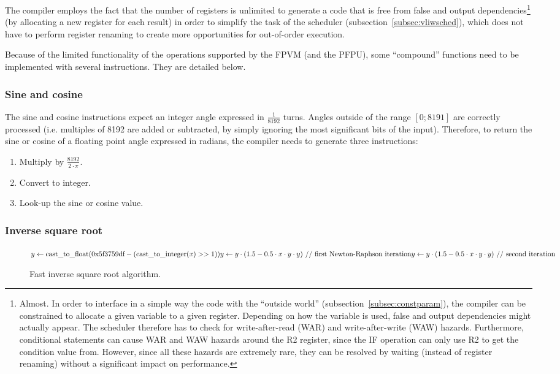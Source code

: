 \documentclass[a4paper,11pt]{kthesis}
\begin{document}
The compiler employs the fact that the number of registers is unlimited to generate a code that is free from false and output dependencies\footnote{Almost. In order to interface in a simple way the code with the ``outside world'' (subsection~\ref{subsec:constparam}), the compiler can be constrained to allocate a given variable to a given register. Depending on how the variable is used, false and output dependencies might actually appear. The scheduler therefore has to check for write-after-read (WAR) and write-after-write (WAW) hazards. Furthermore, conditional statements can cause WAR and WAW hazards around the R2 register, since the IF operation can only use R2 to get the condition value from. However, since all these hazards are extremely rare, they can be resolved by waiting (instead of register renaming) without a significant impact on performance.} (by allocating a new register for each result) in order to simplify the task of the scheduler (subsection~\ref{subsec:vliwsched}), which does not have to perform register renaming to create more opportunities for out-of-order execution.

Because of the limited functionality of the operations supported by the FPVM (and the PFPU), some ``compound'' functions need to be implemented with several instructions. They are detailed below.

\subsubsection{Sine and cosine}
The sine and cosine instructions expect an integer angle expressed in $\frac{1}{8192}$ turns. Angles outside of the range $[0; 8191]$ are correctly processed (i.e. multiples of 8192 are added or subtracted, by simply ignoring the most significant bits of the input). Therefore, to return the sine or cosine of a floating point angle expressed in radians, the compiler needs to generate three instructions:
\begin{enumerate}
\item Multiply by $\frac{8192}{2 \cdot \pi}$.
\item Convert to integer.
\item Look-up the sine or cosine value.
\end{enumerate}

\subsubsection{Inverse square root}
\begin{figure}
\centering
\begin{boxedminipage}{13cm}
\begin{math}
y \leftarrow \textrm{cast\_to\_float}(\textrm{0x5f3759df} - (\textrm{cast\_to\_integer}(x) >> 1)) \\
y \leftarrow y \cdot (1.5 - 0.5 \cdot x \cdot y \cdot y)\textrm{ // first Newton-Raphson iteration} \\
y \leftarrow y \cdot (1.5 - 0.5 \cdot x \cdot y \cdot y)\textrm{ // second iteration}
\end{math}
\end{boxedminipage}
\caption{Fast inverse square root algorithm.}
\label{fig:invsqrt}
\end{figure}
\end{document}
